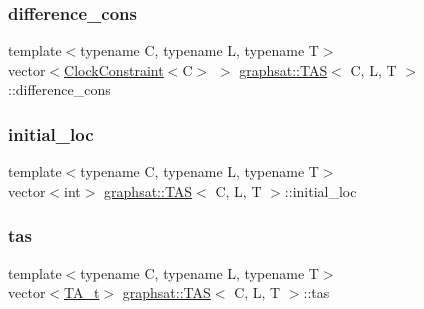 \mbox{\label{classgraphsat_1_1_t_a_s_a61700cc59d694adefbe0a9b6a1e9acad}} 
\subsubsection{\texorpdfstring{difference\_cons}{difference\_cons}}
{\footnotesize\ttfamily template$<$typename C, typename L, typename T$>$ \\
vector$<$\mbox{\hyperlink{classgraphsat_1_1_clock_constraint}{Clock\+Constraint}}$<$C$>$ $>$ \mbox{\hyperlink{classgraphsat_1_1_t_a_s}{graphsat\+::\+T\+AS}}$<$ C, L, T $>$\+::difference\+\_\+cons\hspace{0.3cm}{\ttfamily [private]}}

\mbox{\label{classgraphsat_1_1_t_a_s_a3f3d799013aed8cf917c43d635fa3d20}} 
\subsubsection{\texorpdfstring{initial\_loc}{initial\_loc}}
{\footnotesize\ttfamily template$<$typename C, typename L, typename T$>$ \\
vector$<$int$>$ \mbox{\hyperlink{classgraphsat_1_1_t_a_s}{graphsat\+::\+T\+AS}}$<$ C, L, T $>$\+::initial\+\_\+loc\hspace{0.3cm}{\ttfamily [private]}}

\mbox{\label{classgraphsat_1_1_t_a_s_a34137871f2ec794eb7dab7a37f113e02}} 
\subsubsection{\texorpdfstring{tas}{tas}}
{\footnotesize\ttfamily template$<$typename C, typename L, typename T$>$ \\
vector$<$\mbox{\hyperlink{classgraphsat_1_1_t_a_s_a74d326d2d6c5868f7394bfd460544a3b}{T\+A\+\_\+t}}$>$ \mbox{\hyperlink{classgraphsat_1_1_t_a_s}{graphsat\+::\+T\+AS}}$<$ C, L, T $>$\+::tas\hspace{0.3cm}{\ttfamily [private]}}

